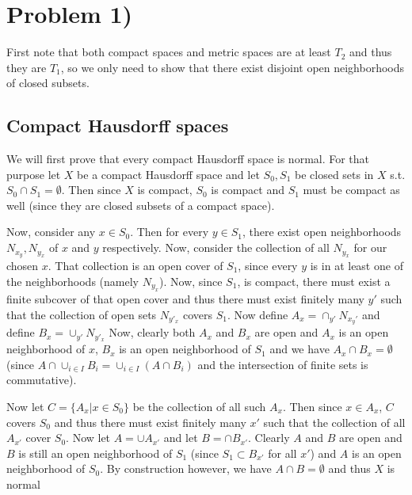 
\section*{Problem 1)}
First note that both compact spaces and metric spaces are at least $T_2$ and thus they are $T_1$, so we only need to show that there exist disjoint open neighborhoods of closed subsets. 
\subsection*{Compact Hausdorff spaces}
We will first prove that every compact Hausdorff space is normal. For that purpose let $X$ be a compact Hausdorff space and let $S_0, S_1$ be closed sets in $X$ s.t. $S_0\cap S_1 = \emptyset$. Then since $X$ is compact, $S_0$ is compact and $S_1$ must be compact as well (since they are closed subsets of a compact space). \par
Now, consider any $x\in S_0$. Then for every $y\in S_1$, there exist open neighborhoods $N_{x_y}, N_{y_x}$ of $x$ and $y$ respectively. Now, consider the collection of all $N_{y_x}$ for our chosen $x$. That collection is an open cover of $S_1$, since every $y$ is in at least one of the neighborhoods (namely $N_{y_x}$). Now, since $S_1$, is compact, there must exist a finite subcover of that open cover and thus there must exist finitely many $y'$ such that the collection of open sets $N_{y'_x}$ covers $S_1$. Now define $A_x=\cap_{y'}  N_{x_y'}$ and define $B_x = \cup_{y'} N_{y'_x}$ Now, clearly both $A_x$ and $B_x$ are open and $A_x$ is an open neighborhood of $x$, $B_x$ is an open neighborhood of $S_1$ and we have $A_x\cap B_x=\emptyset$ (since $A\cap \cup_{i\in I} B_i = \cup_{i\in I}  (A \cap B_i)$ and the intersection of finite sets is commutative). \par 
Now let $C=\{A_x | x\in S_0\}$ be the collection of all such $A_x$. Then since $x\in A_x$, $C$ covers $S_0$ and thus there must exist finitely many $x'$ such that the collection of all $A_{x'}$ cover $S_0$. Now let $A=\cup A_{x'}$ and let $B=\cap B_{x'}$. Clearly $A$ and $B$ are open and $B$ is still an open neighborhood of $S_1$ (since $S_1\subset B_{x'}$ for all $x'$) and $A$ is an open neighborhood of $S_0$. By construction however, we have $A\cap B= \emptyset$ and thus $X$ is normal \par
